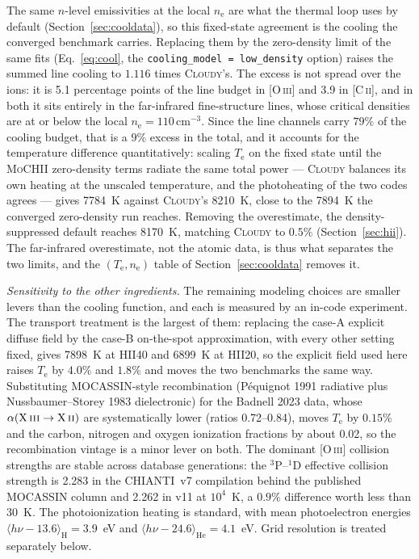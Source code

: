 \documentclass[twocolumn,linenumbers]{aastex702}
\newcommand{\code}[1]{\texttt{#1}}
\newcommand{\MoCHII}{\textsc{MoCHII}}
\newcommand{\Te}{T_{\mathrm{e}}}
\newcommand{\nelec}{n_{\mathrm{e}}}
\begin{document}
The same $n$-level emissivities at the local $\nelec$ are what the thermal
loop uses by default (Section~\ref{sec:cooldata}), so this fixed-state
agreement is the cooling the converged benchmark carries.  Replacing them
by the zero-density limit of the same fits (Eq.~\ref{eq:cool}, the
\code{cooling\_model = low\_density} option) raises the summed line cooling
to $1.116$ times \textsc{Cloudy}'s.  The excess is not spread over the
ions: it is 5.1 percentage points of the line budget in [O\,\textsc{iii}]
and 3.9 in [C\,\textsc{ii}], and in both it sits entirely in the
far-infrared fine-structure lines, whose critical densities are at or below
the local $\nelec = 110\,\mathrm{cm^{-3}}$.  Since the line channels carry
$79\%$ of the cooling budget, that is a $9\%$ excess in the total, and it
accounts for the temperature difference quantitatively: scaling $\Te$ on the
fixed state until the \MoCHII{} zero-density terms radiate the same total
power --- \textsc{Cloudy} balances its own heating at the unscaled
temperature, and the photoheating of the two codes agrees --- gives 7784~K
against \textsc{Cloudy}'s 8210~K, close to the 7894~K the converged
zero-density run reaches.  Removing the overestimate, the density-suppressed
default reaches 8170~K, matching \textsc{Cloudy} to $0.5\%$
(Section~\ref{sec:hii}).  The far-infrared overestimate, not the atomic
data, is thus what separates the two limits, and the $(\Te,\nelec)$ table of
Section~\ref{sec:cooldata} removes it.

\emph{Sensitivity to the other ingredients.}  The remaining modeling
choices are smaller levers than the cooling function, and each is measured
by an in-code experiment.  The transport treatment is the largest of them:
replacing the case-A explicit diffuse field by the case-B on-the-spot
approximation, with every other setting fixed, gives 7898~K at HII40 and
6899~K at HII20, so the explicit field used here raises $\Te$ by $4.0\%$
and $1.8\%$ and moves the two benchmarks the same way.  Substituting
MOCASSIN-style recombination
(P\'equignot 1991 radiative plus Nussbaumer--Storey 1983 dielectronic) for
the Badnell 2023 data, whose $\alpha(\mathrm{X\,\textsc{iii}} \to
\mathrm{X\,\textsc{ii}})$ are systematically lower (ratios 0.72--0.84),
moves $\Te$ by $0.15\%$ and the carbon, nitrogen and oxygen ionization
fractions by about 0.02, so the recombination vintage is a minor lever on
both.  The dominant
[O\,\textsc{iii}] collision strengths are stable across database
generations: the $^3\mathrm{P}$--$^1\mathrm{D}$ effective collision
strength is 2.283 in the CHIANTI~v7 compilation behind the published
MOCASSIN column and 2.262 in v11 at $10^4$~K, a $0.9\%$ difference worth
less than 30~K.  The photoionization heating is standard, with mean
photoelectron energies $\langle h\nu - 13.6\rangle_{\mathrm{H}} = 3.9$~eV
and $\langle h\nu - 24.6\rangle_{\mathrm{He}} = 4.1$~eV.  Grid resolution
is treated separately below.
\end{document}
